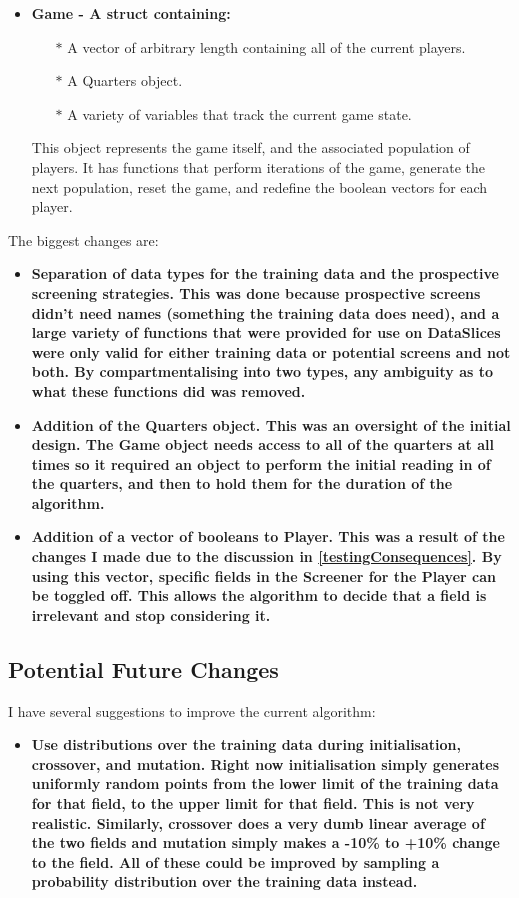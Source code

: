 \begin{itemize}
    \item \bf Game \rm - A struct containing:
    \begin{itemize}
        \item[$\ast$] A vector of arbitrary length containing all of the current players.
        \item[$\ast$] A Quarters object.
        \item[$\ast$] A variety of variables that track the current game state.
    \end{itemize}
        This object represents the game itself, and the associated population of players. It has functions that perform iterations of the game, generate the next population, reset the game, and redefine the boolean vectors for each player.
\end{itemize}

The biggest changes are:
\begin{itemize}
    \item \bf Separation of data types for the training data and the prospective screening strategies. \rm This was done because prospective screens didn't need names (something the training data does need), and a large variety of functions that were provided for use on DataSlices were only valid for either training data or potential screens and not both. By compartmentalising into two types, any ambiguity as to what these functions did was removed.
    \item \bf Addition of the Quarters object. \rm This was an oversight of the initial design. The Game object needs access to all of the quarters at all times so it required an object to perform the initial reading in of the quarters, and then to hold them for the duration of the algorithm.
    \item \bf Addition of a vector of booleans to Player. \rm This was a result of the changes I made due to the discussion in \ref{testingConsequences}. By using this vector, specific fields in the Screener for the Player can be toggled off. This allows the algorithm to decide that a field is irrelevant and stop considering it.
\end{itemize}

\subsection{Potential Future Changes}
I have several suggestions to improve the current algorithm:

\begin{itemize}
    \item \bf Use distributions over the training data during initialisation, crossover, and mutation. \rm Right now initialisation simply generates uniformly random points from the lower limit of the training data for that field, to the upper limit for that field. This is not very realistic. Similarly, crossover does a very dumb linear average of the two fields and mutation simply makes a -10\% to +10\% change to the field. All of these could be improved by sampling a probability distribution over the training data instead.
\end{itemize}